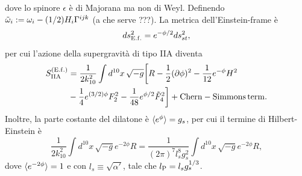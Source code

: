 dove lo spinore $\epsilon$ è di Majorana ma non di Weyl. Definendo $\tilde{\omega}_i := \omega_i - (1/2)H_i\Gamma^{ijk}$ (a che serve ???). La metrica dell'Einstein-frame è 
\begin{equation}
    ds_{\mathrm{E.f.}}^2 = e^{-\phi/2}ds_{st}^2,
\end{equation}
per cui l'azione della supergravità di tipo IIA diventa 
\begin{equation}
    \begin{split}
        S_{\mathrm{IIA}}^{(\mathrm{E.f.})} &= \frac{1}{2k_{10}^2}\int d^{10}x\,\sqrt{-g}\bigg[R - \frac{1}{2}(\partial\phi)^2 - \frac{1}{12}e^{-\phi}H^2 \\
        &- \frac{1}{4}e^{(3/2)\phi}F_2^2 - \frac{1}{48}e^{\phi/2}\tilde{F}_4^2\bigg] + \mathrm{Chern-Simmons\,term}.
    \end{split}
\end{equation}
Inoltre, la parte costante del dilatone è $\langle e^{\phi} \rangle = g_s$, per cui il termine di Hilbert-Einstein è 
\begin{equation}
    \frac{1}{2k_{10}^2}\int d^{10}x\,\sqrt{-g}e^{-2\phi}R = \frac{1}{(2\pi)^7l_s^8g_s^2}\int d^{10}x\,\sqrt{-g}e^{-2\phi}R,
\end{equation}
dove $\langle e^{-2\phi} \rangle = 1$ e con $l_s \equiv \sqrt{\alpha'}$, tale che $l_{\mathrm{P}} = l_sg_s^{1/3}$.

